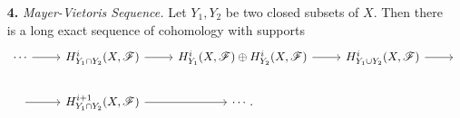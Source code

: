 \documentclass{article}
\newcommand{\fF}{\mathscr{F}}
\newcommand\restr[2]{{\left.\kern-\nulldelimiterspace #1 \vphantom{\big|} \right|_{#2}}}
\begin{document}
\begin{enumerate} [label=\textbf{\arabic*.}, leftmargin=0em]

    

\item[\textbf{4.}] \textit{Mayer-Vietoris Sequence.} Let $Y_1, Y_2$ be two closed subsets of $X$. Then there is a long exact sequence of cohomology with supports
\[ \begin{tikzcd}
    \cdots \arrow[r] & {H^i_{Y_1 \cap Y_2}(X, \fF)} \arrow[r]       & {H_{Y_1}^i(X, \fF) \oplus H_{Y_2}^i(X, \fF)} \arrow[r] & {H^i_{Y_1 \cup Y_2}(X, \fF)} \arrow[r] & {} \\
    {} \arrow[r]     & {H^{i + 1}_{Y_1 \cap Y_2}(X, \fF)} \arrow[r] & \cdots .                                               &                                        &   
\end{tikzcd} \] 


\end{enumerate}
\end{document}
